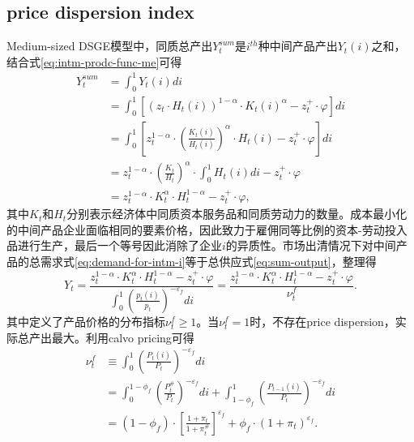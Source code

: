 \subsection{price dispersion index}
\label{seq:intm-price-dispersion}
Medium-sized DSGE模型中，同质总产出$Y^{sum}_t$是$i^{th}$种中间产品产出$Y_t(i)$之和，结合式\eqref{eq:intm-prodc-func-me}可得
\begin{equation}
\label{eq:sum-output}
\begin{split}
Y^{sum}_t &= \int^1_0 Y_t(i) di \\
&=\int^1_0 \left[\left(z_t \cdot H_{t}(i)\right)^{1-\alpha} \cdot K_{t}(i)^{\alpha} - z^+_t \cdot \varphi \right] di \\
&=\int^1_0 \left[z_t^{1-\alpha} \cdot \left(\frac{K_{t}(i)}{H_{t}(i)}\right)^{\alpha} \cdot H_{t}(i) - z^+_t \cdot \varphi \right] di \\
&=z_t^{1-\alpha} \cdot \left(\frac{K_{t}}{H_{t}}\right)^{\alpha} \cdot \int_0^1 H_t(i) di - z^+_t \cdot \varphi \\
&= z_t^{1-\alpha} \cdot K_t^{\alpha} \cdot H_t^{1-\alpha} - z^+_t \cdot \varphi,
\end{split}
\end{equation}
其中$K_t$和$H_t$分别表示经济体中同质资本服务品和同质劳动力的数量。成本最小化的中间产品企业面临相同的要素价格，因此致力于雇佣同等比例的资本-劳动投入品进行生产，最后一个等号因此消除了企业$i$的异质性。市场出清情况下对中间产品的总需求式\eqref{eq:demand-for-intm-i}等于总供应式\eqref{eq:sum-output}，整理得
\begin{equation}
  \label{eq:intm-price-idx-nu}
  Y_t = \frac{
    z_t^{1-\alpha} \cdot K_t^{\alpha} \cdot H_t^{1-\alpha} -z_t^+ \cdot \varphi
  }{
    \int_0^1 \left(\frac{p_t(i)}{p_t}\right)^{-\varepsilon_f} di
  }=\frac{
    z_t^{1-\alpha} \cdot K_t^{\alpha} \cdot H_t^{1-\alpha} -z_t^+ \cdot \varphi
  }{
    \nu_t^f
  }.
\end{equation}
其中定义了产品价格的分布指标$\nu_t^f \ge 1$。当$\nu_t^f = 1$时，不存在price dispersion，实际总产出最大。利用calvo pricing可得
\begin{align}
  \label{eq:prod-price-dispersion-calvo}
  \nu_t^f & \equiv \int_0^1 \left( \frac{P_t(i)}{P_t} \right)^{-\varepsilon_f} di \nonumber \\
           &=\int_{0}^{1-\phi_f} \left( \frac{P_t^{\#}}{P_t}\right)^{-\varepsilon_f} di + \int_{1-\phi_f}^{1} \left( \frac{P_{t-1}(i)}{P_t} \right)^{-\varepsilon_f} di \nonumber \\
&=(1-\phi_f) \cdot \left[
  \frac{
  1+\pi_t
  }{
  1+\pi_t^{\#}
  }
\right]^{\varepsilon_f}
+ \phi_f \cdot (1+\pi_t)^{\varepsilon_f}.
\end{align}

